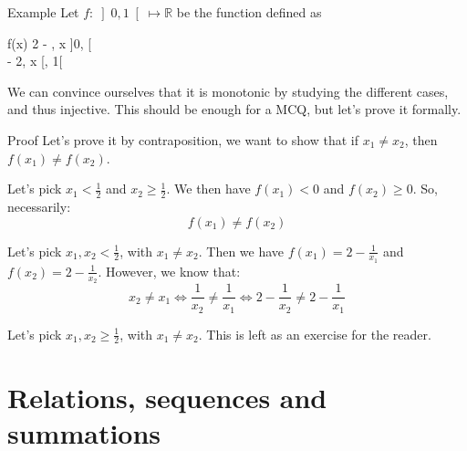 \documentclass[a4paper]{article}
\begin{document}
\begin{parag}{Example}
    Let $f : \left]0, 1\right[ \mapsto \mathbb{R}$ be the function defined as
    \begin{functionbypart}{f\left(x\right)}
        2 - , \mathspace x \in \left]0, \right[  \\
         - 2, \mathspace x \in \left[, 1\right[ 
    \end{functionbypart}
   
    We can convince ourselves that it is monotonic by studying the different cases, and thus injective. This should be enough for a MCQ, but let's prove it formally.
    
    \begin{subparag}{Proof}
        Let's prove it by contraposition, we want to show that if $x_1 \neq x_2$, then $f\left(x_1\right) \neq f\left(x_2\right)$.

         Let's pick $x_1 < \frac{1}{2}$ and $x_2 \geq \frac{1}{2}$. We then have $f\left(x_1\right) < 0$ and $f\left(x_2\right) \geq 0$. So, necessarily: 
        \[f\left(x_1\right) \neq f\left(x_2\right)\]

         Let's pick $x_1, x_2 < \frac{1}{2}$, with $x_1 \neq x_2$. Then we have $f\left(x_1\right) = 2 - \frac{1}{x_1}$ and $f\left(x_2\right) = 2 - \frac{1}{x_2}$. However, we know that:
        \[x_2 \neq x_1 \iff \frac{1}{x_2} \neq \frac{1}{x_1} \iff 2 - \frac{1}{x_2} \neq 2 - \frac{1}{x_1}\]
        
         Let's pick $x_1, x_2 \geq \frac{1}{2}$, with $x_1 \neq x_2$. This is left as an exercise for the reader.
    \end{subparag}
    
\end{parag}

\section{Relations, sequences and summations}
\end{document}
